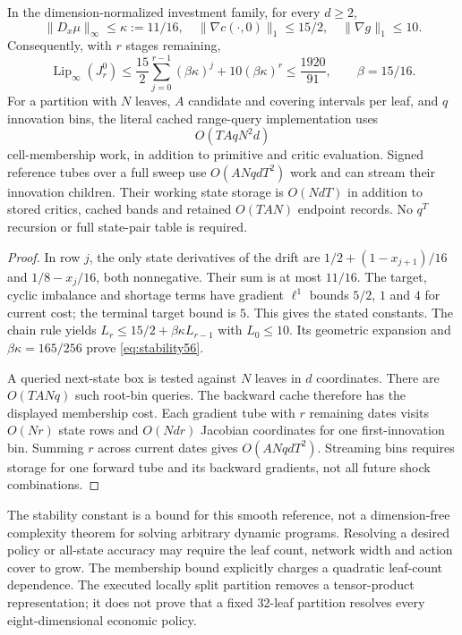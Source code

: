 \begin{proposition}\label{prop:work56}
In the dimension-normalized investment family, for every $d\ge2$,
\[
 \|D_x\mu\|_\infty\le\kappa:=11/16,
 \quad \|\nabla c(\cdot,0)\|_1\le15/2,
 \quad \|\nabla g\|_1\le10.
\]
Consequently, with $r$ stages remaining,
\begin{equation}\label{eq:stability56}
 \operatorname{Lip}_{\infty}(J^0_r)
 \le\frac{15}{2}\sum_{j=0}^{r-1}(\beta\kappa)^j
                 +10(\beta\kappa)^r
 \le\frac{1920}{91},\qquad \beta=15/16.
\end{equation}
For a partition with $N$ leaves, $A$ candidate and covering intervals per leaf, and $q$ innovation bins, the literal cached range-query implementation uses
\[
 O(TAqN^2d)
\]
cell-membership work, in addition to primitive and critic evaluation. Signed reference tubes over a full sweep use $O(ANqdT^2)$ work and can stream their innovation children. Their working state storage is $O(NdT)$ in addition to stored critics, cached bands and retained $O(TAN)$ endpoint records. No $q^T$ recursion or full state-pair table is required.
\end{proposition}
\begin{proof}
In row $j$, the only state derivatives of the drift are $1/2+(1-x_{j+1})/16$ and $1/8-x_j/16$, both nonnegative. Their sum is at most $11/16$. The target, cyclic imbalance and shortage terms have gradient $\ell^1$ bounds $5/2$, $1$ and $4$ for current cost; the terminal target bound is $5$. This gives the stated constants. The chain rule yields $L_r\le15/2+\beta\kappa L_{r-1}$ with $L_0\le10$. Its geometric expansion and $\beta\kappa=165/256$ prove \eqref{eq:stability56}.

A queried next-state box is tested against $N$ leaves in $d$ coordinates. There are $O(TANq)$ such root-bin queries. The backward cache therefore has the displayed membership cost. Each gradient tube with $r$ remaining dates visits $O(Nr)$ state rows and $O(Ndr)$ Jacobian coordinates for one first-innovation bin. Summing $r$ across current dates gives $O(ANqdT^2)$. Streaming bins requires storage for one forward tube and its backward gradients, not all future shock combinations.
\end{proof}

The stability constant is a bound for this smooth reference, not a dimension-free complexity theorem for solving arbitrary dynamic programs. Resolving a desired policy or all-state accuracy may require the leaf count, network width and action cover to grow. The membership bound explicitly charges a quadratic leaf-count dependence. The executed locally split partition removes a tensor-product representation; it does not prove that a fixed 32-leaf partition resolves every eight-dimensional economic policy.

